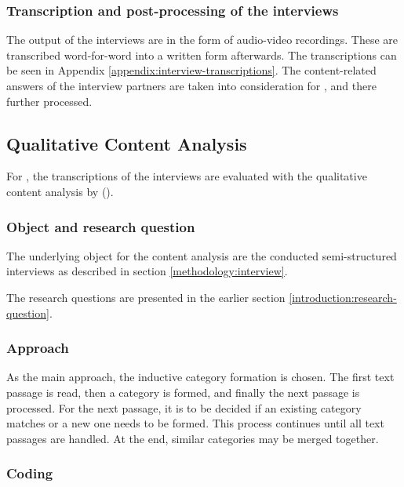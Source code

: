 \subsubsection*{Transcription and post-processing of the interviews}

The output of the interviews are in the form of audio-video recordings.
These are transcribed word-for-word into a written form afterwards.
The transcriptions can be seen in Appendix \ref{appendix:interview-transcriptions}.
The content-related answers of the interview partners are taken into consideration
for , and there further processed.





\subsection{Qualitative Content Analysis}

For ,
the transcriptions of the interviews are evaluated with
the qualitative content analysis by
\citeauthor{mayring2019qualitative} (\citeyear{mayring2019qualitative}).

\subsubsection*{Object and research question}

The underlying object for the content analysis are
the conducted semi-structured interviews as described in section \ref{methodology:interview}.

The research questions are presented in the earlier section \ref{introduction:research-question}.

\subsubsection*{Approach}

As the main approach,
the inductive category formation
is chosen.
The first text passage is read,
then a category is formed,
and finally the next passage is processed.
For the next passage,
it is to be decided if an existing category matches
or a new one needs to be formed.
This process continues until all text passages are handled.
At the end, similar categories may be merged together.

\subsubsection*{Coding}

